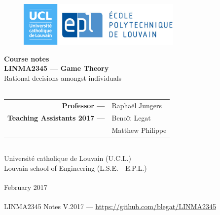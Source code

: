 \ifx \globalmark \undefined %

\else 	
\fi



\begin{titlepage}
\begin{center}



\vfill

\begin{figure}[!ht]
\centering
\includegraphics[width = 8cm]{Logo_UCL-EPL.eps}
\end{figure}







{ \bfseries Course notes }
\hrulefill\\[0.5cm]
\large{\textbf{LINMA2345 --- Game Theory}\\
Rational decisions amongst individuals} \\
\hrulefill\\[0.5cm]


\vfill
\vfill
\parbox[H][][c]{\textwidth}
	{
	\begin{tabular}{rl}
	\textbf{Professor ---} &  Rapha\"el Jungers \\	 		
	\textbf{Teaching Assistants 2017 ---} 	 &	Beno\^it Legat \\	
		     &	Matthew Philippe 	
	\end{tabular}
	}\par
	



%
$\,$\\[1cm]


Universit\'e catholique de Louvain (U.C.L.)\\
Louvain school of Engineering (L.S.E. - E.P.L.)\\
$\,$\\
February 2017\\
$\,$\\
\tiny{LINMA2345 Notes V.2017 --- \url{https://github.com/blegat/LINMA2345}}
\end{center}

\end{titlepage}







